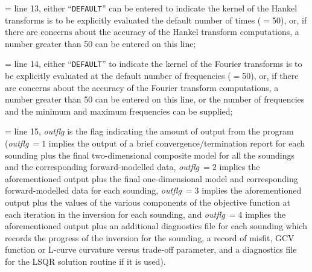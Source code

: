 \hangindent=\parindent{}\noindent
line 13, either ``{\tt DEFAULT}'' can be entered to indicate the kernel of the Hankel transforms
is to be explicitly evaluated the default number of times ($=$50), or, if there are concerns about
the accuracy of the Hankel transform computations, a number greater than 50 can be entered on this
line;

\hangindent=\parindent{}\noindent
line 14, either ``{\tt DEFAULT}'' to indicate the kernel of the Fourier transforms is to be
explicitly evaluated at the default number of frequencies ($=$50), or, if there are concerns about
the accuracy of the Fourier transform computations, a number greater than 50 can be entered on this
line, or the number of frequencies and the minimum and maximum frequencies can be supplied;

\hangindent=\parindent{}\noindent
line 15, {\sl outflg\/} is the flag indicating the amount of output from the program
({\sl outflg\/}$\>=1$ implies the output of a brief convergence/termination report for each
sounding plus the final two-dimensional composite model for all the soundings and the corresponding
forward-modelled data, {\sl outflg\/}$\>=2$ implies the aforementioned output plus the final
one-dimensional model and corresponding forward-modelled data for each sounding,
{\sl outflg\/}$\>=3$ implies the aforementioned output plus the values of the various components
of the objective function at each iteration in the inversion for each sounding, and
{\sl outflg\/}$\>=4$ implies the aforementioned output plus an additional diagnostics file for
each sounding which records the progress of the inversion for the sounding, a record of misfit,
GCV function or L-curve curvature versus trade-off parameter, and a diagnostics file for the
LSQR solution routine if it is used).


